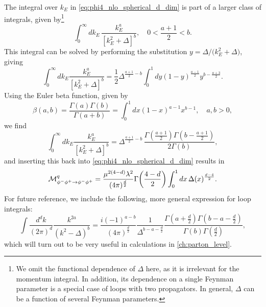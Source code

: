 The integral over $k_E$ in \cref{eq:phi4_nlo_spherical_d_dim} is part of a larger class of integrals, given by\footnote{We omit the functional dependence of $\Delta$ here, as it is irrelevant for the momentum integral. In addition, its dependence on a single Feynman parameter is a special case of loops with two propagators. In general, $\Delta$ can be a function of several Feynman parameters.}
\begin{equation}
    \int_0^\infty dk_E \, \frac{k_E^a}{[k_E^2+\Delta]^b}, \quad 0 < \frac{a+1}{2} < b.
\end{equation}
This integral can be solved by performing the substitution $y=\Delta/\bigl(k_E^2+\Delta\bigr)$, giving
\begin{equation}
    \int_0^\infty dk_E \frac{k_E^a}{[k_E^2+\Delta]^b}
    = \frac{1}{2}\Delta^{\frac{a+1}{2}-b} \int_0^1 dy (1-y)^{\frac{a-1}{2}}y^{b-\frac{a+3}{2}}.
\end{equation}
Using the Euler beta function, given by~\cite{Schwartz:2014sze}
\begin{equation}
    \beta(a,b) = \frac{\Gamma(a)\Gamma(b)}{\Gamma(a+b)} = \int_0^1 dx(1-x)^{a-1}x^{b-1}, \quad a,b > 0,
\end{equation}
we find
\begin{equation}
    \int_0^\infty dk_E \frac{k_E^a}{[k_E^2+\Delta]^b}
    = \Delta^{\frac{a+1}{2}-b} \, \frac{\Gamma(\frac{a+1}{2})\Gamma(b-\frac{a+1}{2})}{2\Gamma(b)},
\end{equation}
and inserting this back into \cref{eq:phi4_nlo_spherical_d_dim} results in
\begin{equation}\label{eq:phi4_nlo_no_momentum_d_dim}
    \mathcal{M}_{\phi^-\phi^+\to\phi^-\phi^+}^q = \frac{\mu^{2(4-d)}\lambda^2}{(4\pi)^{\frac{d}{2}}} \Gamma\biggl(\frac{4-d}{2}\biggr) \int_0^1 dx \, \Delta(x)^{\frac{d-4}{2}}.
\end{equation}
For future reference, we include the following, more general expression for loop integrals:
\begin{equation}\label{eq:general_loop_d_dim}
    \int\frac{d^dk}{(2\pi)^d} \frac{k^{2a}}{(k^2-\Delta)^b} = \frac{i(-1)^{a-b}}{(4\pi)^{\frac{d}{2}}} \frac{1}{\Delta^{b-a-\frac{d}{2}}} \frac{\Gamma(a+\frac{d}{2}) \Gamma(b-a-\frac{d}{2})}{\Gamma(b)\Gamma(\frac{d}{2})},
\end{equation}
which will turn out to be very useful in calculations in \cref{ch:parton_level}.

